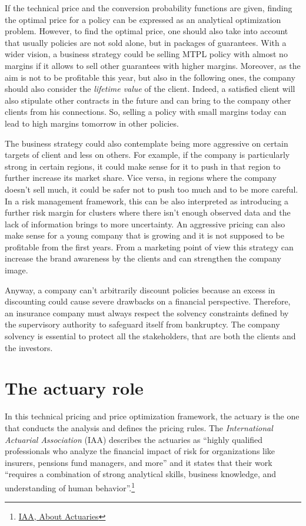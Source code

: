 \documentclass[a4paper, nobind]{templates/ociamthesis}
\theoremstyle{definition}
\theoremstyle{definition}
\theoremstyle{definition}
\theoremstyle{remark}
\begin{document}
If the technical price and the conversion probability functions are given, finding the optimal price for a policy can be expressed as an analytical optimization problem. However, to find the optimal price, one should also take into account that usually policies are not sold alone, but in packages of guarantees. With a wider vision, a business strategy could be selling MTPL policy with almost no margins if it allows to sell other guarantees with higher margins. Moreover, as the aim is not to be profitable this year, but also in the following ones, the company should also consider the \emph{lifetime value} of the client. Indeed, a satisfied client will also stipulate other contracts in the future and can bring to the company other clients from his connections. So, selling a policy with small margins today can lead to high margins tomorrow in other policies.

The business strategy could also contemplate being more aggressive on certain targets of client and less on others. For example, if the company is particularly strong in certain regions, it could make sense for it to push in that region to further increase its market share. Vice versa, in regions where the company doesn't sell much, it could be safer not to push too much and to be more careful. In a risk management framework, this can be also interpreted as introducing a further risk margin for clusters where there isn't enough observed data and the lack of information brings to more uncertainty. An aggressive pricing can also make sense for a young company that is growing and it is not supposed to be profitable from the first years. From a marketing point of view this strategy can increase the brand awareness by the clients and can strengthen the company image.

Anyway, a company can't arbitrarily discount policies because an excess in discounting could cause severe drawbacks on a financial perspective. Therefore, an insurance company must always respect the solvency constraints defined by the supervisory authority to safeguard itself from bankruptcy. The company solvency is essential to protect all the stakeholders, that are both the clients and the investors.

\hypertarget{chap:actuary-role}{%
\section{The actuary role}\label{chap:actuary-role}}

In this technical pricing and price optimization framework, the actuary is the one that conducts the analysis and defines the pricing rules. The \emph{International Actuarial Association} (IAA) describes the actuaries as ``highly qualified professionals who analyze the financial impact of risk for organizations like insurers, pensions fund managers, and more'' and it states that their work ``requires a combination of strong analytical skills, business knowledge, and understanding of human behavior''.\footnote{\href{https://www.actuaries.org/iaa/IAA/About_the_IAA/About_Actuaries/About\%20Actuaries.aspx}{IAA, About Actuaries}}
\end{document}
